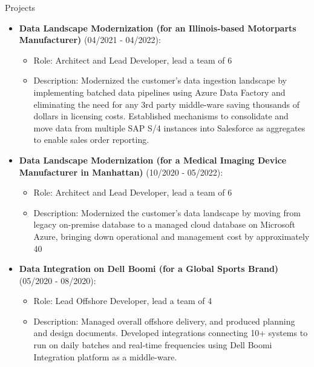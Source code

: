 \documentclass{resume} %
\begin{document}
\begin{rSection}{Projects}
        \begin{itemize}
            \item \textbf{Data Landscape Modernization (for an Illinois-based Motorparts Manufacturer)} (04/2021 - 04/2022):
            \begin{itemize}
                \item Role: Architect and Lead Developer, lead a team of 6
                \item Description: Modernized the customer's data ingestion landscape by implementing batched data pipelines using Azure Data Factory and eliminating the need for any 3rd party middle-ware saving thousands of dollars in licensing costs. Established mechanisms to consolidate and move data from multiple SAP S/4 instances into Salesforce as aggregates to enable sales order reporting.
            \end{itemize}
        \end{itemize}
        
        \begin{itemize}
            \item \textbf{Data Landscape Modernization (for a Medical Imaging Device Manufacturer in Manhattan)} (10/2020 - 05/2022):
            \begin{itemize}
                \item Role: Architect and Lead Developer, lead a team of 6
                \item Description: Modernized the customer's data landscape by moving from legacy on-premise database to a managed cloud database on Microsoft Azure, bringing down operational and management cost by approximately 40%
            \end{itemize}
        \end{itemize}
        
        \begin{itemize}
            \item \textbf{Data Integration on Dell Boomi (for a Global Sports Brand)} (05/2020 - 08/2020):
            \begin{itemize}
                \item Role: Lead Offshore Developer, lead a team of 4
                \item Description: Managed overall offshore delivery, and produced planning and design documents. Developed integrations connecting 10+ systems to run on daily batches and real-time frequencies using Dell Boomi Integration platform as a middle-ware.
            \end{itemize}
        \end{itemize}
        

\end{rSection}
\end{document}
